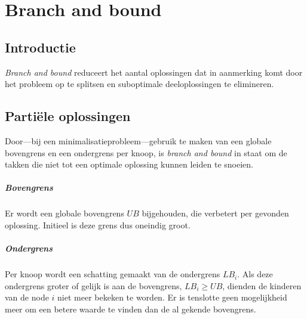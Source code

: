 \chapter{Branch and bound}

\section{Introductie}
\emph{Branch and bound} reduceert het aantal oplossingen dat in aanmerking komt door het probleem op te splitsen en suboptimale deeloplossingen te elimineren. 

\section{Parti\"ele oplossingen}
Door---bij een minimalisatieprobleem---gebruik te maken van een globale bovengrens en een ondergrens per knoop, is \emph{branch and bound} in staat om de takken die niet tot een optimale oplossing kunnen leiden te snoeien.

\paragraph{Bovengrens} Er wordt een globale bovengrens $UB$ bijgehouden, die verbetert per gevonden oplossing. 
Initieel is deze grens dus oneindig groot.

\paragraph{Ondergrens} Per knoop wordt een schatting gemaakt van de ondergrens $LB_i$.
Als deze ondergrens groter of gelijk is aan de bovengrens, $LB_i \geq UB$, dienden de kinderen van de node $i$ niet meer bekeken te worden.
Er is tenslotte geen mogelijkheid meer om een betere waarde te vinden dan de al gekende bovengrens.